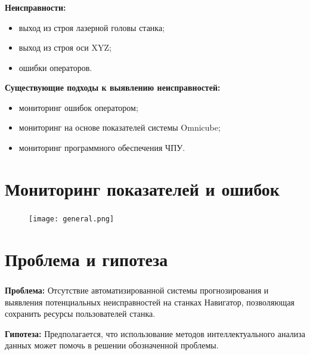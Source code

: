 \begin{frame}
\frametitle{\insertsection}

\textbf{Неисправности:}
\begin{itemize}
    \item выход из строя лазерной головы станка;
    \item выход из строя оси XYZ;
    \item ошибки операторов.
\end{itemize}

\textbf{Существующие подходы к выявлению неисправностей:}
\begin{itemize}
    \item мониторинг ошибок оператором;
    \item мониторинг на основе показателей системы Omnicube;
    \item мониторинг программного обеспечения ЧПУ.
\end{itemize}


\end{frame}


\section{Мониторинг показателей и ошибок}

\begin{frame}
\frametitle{\insertsection}

\begin{figure}
    \center
    \texttt{[image: general.png]}
\end{figure}


\end{frame}


\section{Проблема и гипотеза}

\begin{frame}
    \frametitle{\insertsection}

\textbf{Проблема:}
Отсутствие автоматизированной системы прогнозирования и выявления потенциальных неисправностей
на станках Навигатор, позволяющая сохранить ресурсы пользователей станка.

\vspace{\baselineskip}

\textbf{Гипотеза:}
Предполагается, что использование методов интеллектуального анализа данных
может помочь в решении обозначенной проблемы.


\end{frame}

